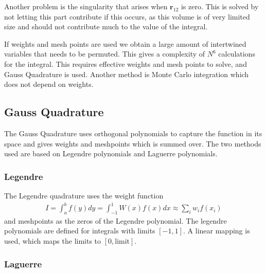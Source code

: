 \documentclass[11pt,a4paper,english,final]{article}
\numberwithin{equation}{section}
\newcommand{\ve}[1]{\mathbf{#1}} %
\begin{document}
Another problem is the singularity that arises when $\ve{r}_{12}$ is zero. 
This is solved by not letting this part contribute if this occurs, as 
this volume is of very limited size and should not contribute much 
to the value of the integral.

If weights and mesh points are used we obtain a large amount of
intertwined 
variables that needs to be permuted. This gives a complexity of 
$N^6$ calculations for the integral.
This requires effective weights and mesh points to solve, and Gauss 
Quadrature is used. Another method is Monte Carlo integration which 
does not depend on weights.

\subsection{Gauss Quadrature}

The Gauss Quadrature uses orthogonal polynomials to capture the 
function in its space and gives weights and meshpoints which is 
summed over. The two methods used are based on Legendre polynomials 
and Laguerre polynomials.

\subsubsection{Legendre}

The Legendre quadrature uses the weight function 
\begin{gather}
I = \int_a^b f(y) dy = \int_{-1}^1 W(x) f(x) dx 
\approx \sum_i w_i f(x_i)
\end{gather}
and meshpoints as the zeros of the Legendre polynomial. 
The legendre polynomials are defined for integrals with limits $[-1,1]$.
A linear mapping is used, which maps the limits to $[0,\text{limit}]$.

\subsubsection{Laguerre}
\end{document}

